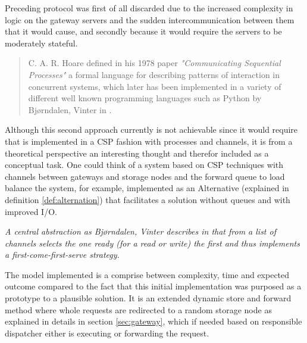 Preceding protocol was first of all discarded due to the increased complexity in logic on the gateway servers and the sudden intercommunication between them that it would cause, and secondly because it would require the servers to be moderately stateful.

\begin{quotation}
C. A. R. Hoare defined in his 1978 paper \textit{"Communicating Sequential Processes"}\cite{Hoare:1978:CSP:359576.359585} a formal language for describing patterns of interaction in concurrent systems, which later has been implemented in a variety of different well known programming languages such as Python by Bj{\o}rndalen, Vinter \etal in \cite{bjorndalen2007pycsp}.
\end{quotation}

\noindent
Although this second approach currently is not achievable since it would require that \CodeName is implemented in a CSP fashion with processes and channels, it is from a theoretical perspective an interesting thought and therefor included as a conceptual task. One could think of a \CodeName system based on CSP techniques with channels between gateways and storage nodes and the forward queue to load balance the system, for example, implemented as an Alternative (explained in definition \ref{def:alternation}) that facilitates a solution without queues and with improved I/O.
\vspace*{3mm}
\begin{definition} \label{def:alternation}
\textit{A central abstraction as Bj{\o}rndalen, Vinter \etal describes in \cite{bjorndalen2007pycsp} that from a list of channels selects the one ready (for a read or write) the first and thus implements a first-come-first-serve strategy.}
\end{definition}

The model implemented is a comprise between complexity, time and expected outcome compared to the fact that this initial \CodeName implementation was purposed as a prototype to a plausible solution. It is an extended dynamic store and forward method where whole requests are redirected to a random storage node as explained in details in section \ref{sec:gateway}, which if needed based on responsible dispatcher either is executing or forwarding the request. 
\newline

